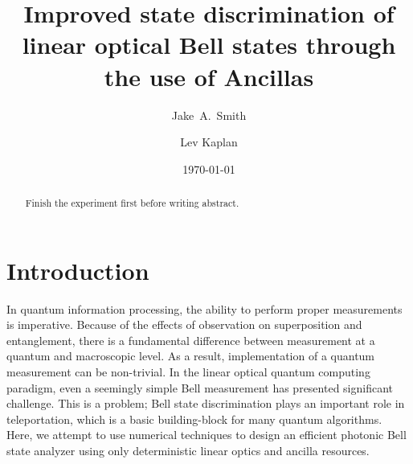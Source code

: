 \documentclass[aps,pra,twocolumn,showpacs,superscriptaddress,floatfix,10pt]{revtex4}
\begin{document}
\newcommand{\beq}{\begin{equation}}
\newcommand{\eeq}{\end{equation}}
\newcommand{\ben}{\begin{eqnarray}}
\newcommand{\een}{\end{eqnarray}}
\newcommand{\bea}{\begin{array}}
\newcommand{\eea}{\end{array}}
\newcommand{\om}{(\omega )}
\newcommand{\bef}{\begin{figure}}
\newcommand{\eef}{\end{figure}}
\newcommand{\leg}[1]{\caption{\protect\rm{\protect\footnotesize{#1}}}}
\newcommand{\ew}[1]{\langle{#1}\rangle}
\newcommand{\be}[1]{\mid\!{#1}\!\mid}
\newcommand{\no}{\nonumber}
\newcommand{\etal}{{\em et~al }}
\newcommand{\geff}{g_{\mbox{\it{\scriptsize{eff}}}}}
\newcommand{\da}[1]{{#1}^\dagger}
\newcommand{\cf}{{\it cf.\/}\ }
\newcommand{\ie}{{\it i.e.\/}\ }   

\newcommand{\spazio}{\vspace{0.3cm}}%
\newcommand{\de}[1]{\frac{\partial}{\partial{#1}}}
\newcommand{\U}{\tilde{U}}
\newcommand{\V}{\tilde{V}}


\title{Improved state discrimination of linear optical Bell states through the use of Ancillas}

\author{Jake~A.~Smith}

\author{Lev Kaplan}

 \begin{abstract}
 	Finish the experiment first before writing abstract.
\end{abstract}                                                               
\date{\today}
\pacs{***}
\maketitle
\section{Introduction}
\label{Intro}
In quantum information processing, the ability to perform proper measurements is imperative. Because of the effects of observation on superposition and entanglement, there is a fundamental difference between measurement at a quantum and macroscopic level. As a result, implementation of a quantum measurement can be non-trivial. In the linear optical quantum computing paradigm, even a seemingly simple Bell measurement has presented significant challenge. This is a problem; Bell state discrimination plays an important role in teleportation, which is a basic building-block for many quantum algorithms. Here, we attempt to use numerical techniques to design an efficient photonic Bell state analyzer using only deterministic linear optics and ancilla resources. 
\end{document}

